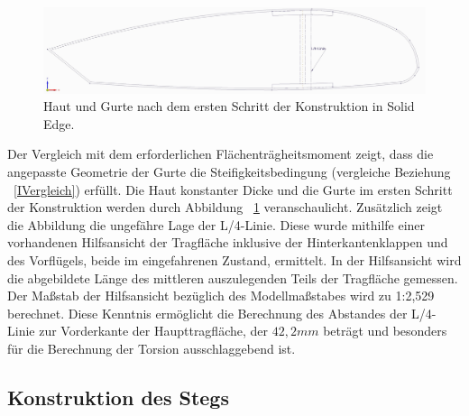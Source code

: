\begin{figure}[h]
	\includegraphics[width=1.0\textwidth]{Bilder/Kontur.jpg}
	\caption{Haut und Gurte nach dem ersten Schritt der Konstruktion in Solid Edge.}
	\label{fig: Kontur}
\end{figure} 
Der Vergleich mit dem erforderlichen Flächenträgheitsmoment zeigt, dass die angepasste Geometrie der Gurte die Steifigkeitsbedingung (vergleiche Beziehung ~\ref{IVergleich}) erfüllt. Die Haut konstanter Dicke und die Gurte im ersten Schritt der Konstruktion werden durch Abbildung ~\ref{fig: Kontur} veranschaulicht. Zusätzlich zeigt die Abbildung die ungefähre Lage der L/4-Linie. Diese wurde mithilfe einer vorhandenen Hilfsansicht der Tragfläche inklusive der Hinterkantenklappen und des Vorflügels, beide im eingefahrenen Zustand, ermittelt. In der Hilfsansicht wird die abgebildete Länge des mittleren auszulegenden Teils der Tragfläche gemessen. Der Maßstab der Hilfsansicht bezüglich des Modellmaßstabes wird zu 1:2,529 berechnet. Diese Kenntnis ermöglicht die Berechnung des Abstandes der L/4-Linie zur Vorderkante der Haupttragfläche, der $ 42,2mm $ beträgt und besonders für die Berechnung der Torsion ausschlaggebend ist.\\

\subsection{Konstruktion des Stegs}

